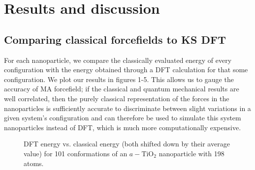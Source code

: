 \documentclass[aps,prb,twocolumn,amsmath,amssymb,superscriptaddress,longbibliography]{revtex4-1}
\newcommand\tab[1][1cm]{\hspace*{#1}} %
\begin{document}

\section*{Results and discussion}

\subsection{Comparing classical forcefields to KS DFT}

\tab For each nanoparticle, we compare the classically evaluated energy of every configuration with the energy obtained through a DFT calculation for that some configuration. 
We plot our results in figures 1-5.
This allows us to gauge the accuracy of MA forcefield; if the classical and quantum mechanical results are well correlated, then the purely classical representation of the forces in the nanoparticles is sufficiently accurate to discriminate between slight variations in a given system's configuration and can therefore be used to simulate this system nanoparticles instead of DFT, which is much more computationally expensive.


\begin{figure}[htb]
\caption{DFT energy vs. classical energy (both shifted down by their average value) for 101 conformations of an $a-\text{TiO}_2$ nanoparticle with 198 atoms.}
\label{nnp_198}
\end{figure}
\end{document}
